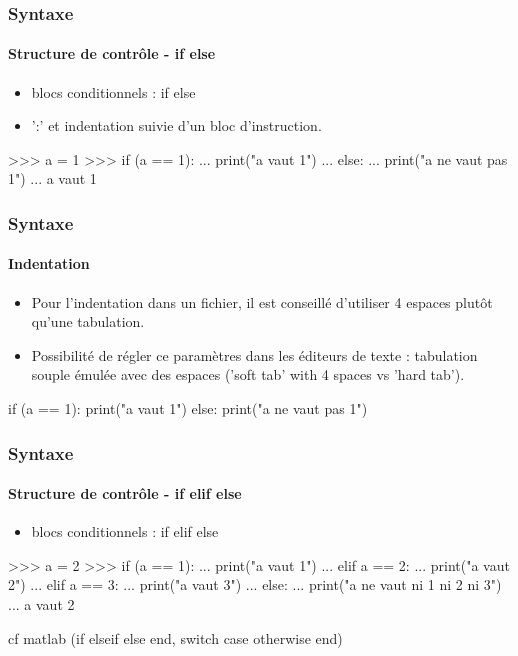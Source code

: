 \begin{frame}[fragile]
\frametitle{Syntaxe}
\framesubtitle{Structure de contrôle - if else}
\begin{itemize}
\item blocs conditionnels : if else
\item ':' et indentation suivie d'un bloc d'instruction.  
\end{itemize}
\begin{pythonConsole}
>>> a = 1
>>> if (a == 1): 
...     print("a vaut 1")
... else: 
...     print("a ne vaut pas 1")
...
a vaut 1
\end{pythonConsole}
\end{frame}
\begin{frame}[fragile]
\frametitle{Syntaxe}
\framesubtitle{Indentation}
\begin{itemize}
\item Pour l'indentation dans un fichier, il est conseillé d'utiliser 4 espaces plutôt qu'une tabulation. 
\item Possibilité de régler ce paramètres dans les éditeurs de texte : tabulation souple émulée avec des espaces ('soft tab' with 4 spaces vs 'hard tab'). 
\end{itemize}
\begin{python}
if (a == 1): 
    print("a vaut 1")
else: 
    print("a ne vaut pas 1")
\end{python}
\end{frame}
\begin{frame}[fragile]
\frametitle{Syntaxe}
\framesubtitle{Structure de contrôle - if elif else}
\begin{itemize}
\item blocs conditionnels : if elif else
\end{itemize}
\begin{pythonConsole}
>>> a = 2
>>> if (a == 1): 
...     print("a vaut 1")
... elif a == 2: 
...     print("a vaut 2")
... elif a == 3: 
...     print("a vaut 3")
... else: 
...     print("a ne vaut ni 1 ni 2 ni 3")
...
a vaut 2
\end{pythonConsole}
cf matlab (if elseif else end, switch case otherwise end) 
\end{frame}
